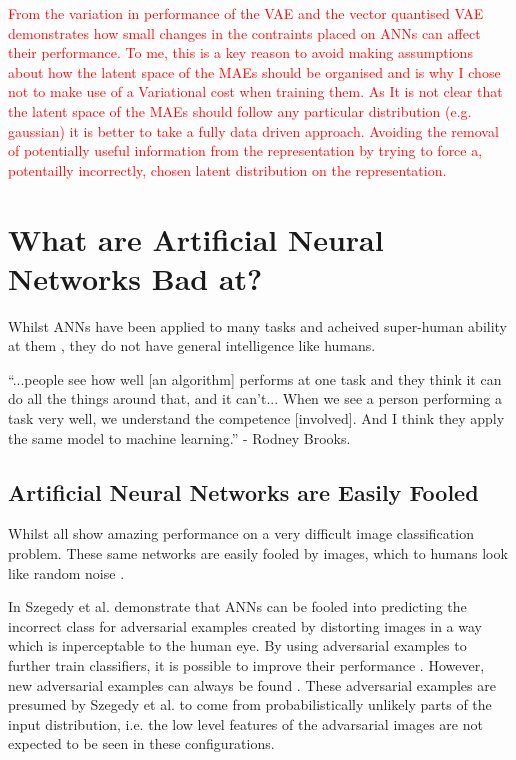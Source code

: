 \textcolor{red}{From the variation in performance of the \ac{VAE} and the vector quantised \ac{VAE} demonstrates how small changes in the contraints placed on \acp{ANN} can affect their performance. To me, this is a key reason to avoid making assumptions about how the latent space of the \acp{MAE} should be organised and is why I chose not to make use of a Variational cost when training them. As It is not clear that the latent space of the \acp{MAE} should follow any particular distribution (e.g. gaussian) it is better to take a fully data driven approach. Avoiding the removal of potentially useful information from the representation by trying to force a, potentailly incorrectly, chosen latent distribution on the representation.}

\section{What are Artificial Neural Networks Bad at?}
Whilst \acp{ANN} have been applied to many tasks and acheived super-human ability at them \cite{vinyals2019alphastar}, they do not have general intelligence like humans.

\begin{displayquote}
``...people see how well [an algorithm] performs at one task and they think it can do all the things around that, and it can’t... When we see a person performing a task very well, we understand the competence [involved]. And I think they apply the same model to machine learning.'' - Rodney Brooks.
\end{displayquote}

\subsection{Artificial Neural Networks are Easily Fooled}
Whilst \cite{krizhevsky2012imagenet, simonyan2014very, szegedy2015going, szegedy2016rethinking, szegedy2017inception, he2016deep, huang2017densely, russakovsky2015imagenet, chiu2018state, eslami2018neural} all show amazing performance on a very difficult image classification problem. These same networks are easily fooled by images, which to humans look like random noise \cite{nguyen2015deep}.


In \cite{szegedy2013intriguing} Szegedy et al. demonstrate that \acp{ANN} can be fooled into predicting the incorrect class for adversarial examples created by distorting images in a way which is inperceptable to the human eye. By using adversarial examples to further train classifiers, it is possible to improve their performance \cite{moosavi2016deepfool}. However, new adversarial examples can always be found \cite{nguyen2015deep}. These adversarial examples are presumed by Szegedy et al. to come from probabilistically unlikely parts of the input distribution, i.e. the low level features of the advarsarial images are not expected to be seen in these configurations.


